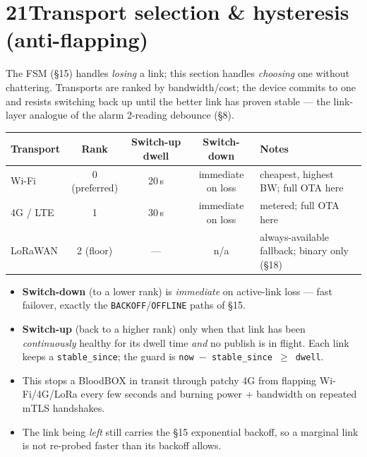 \section*{21\quad Transport selection \& hysteresis (anti-flapping)}
The FSM (\S15) handles \emph{losing} a link; this section handles \emph{choosing} one without
chattering. Transports are ranked by bandwidth/cost; the device commits to one and resists switching
back up until the better link has proven stable — the link-layer analogue of the alarm 2-reading
debounce (\S8).
\begin{center}
\renewcommand{\arraystretch}{1.22}\small
\begin{tabularx}{\textwidth}{@{}l c c c X@{}}
\toprule
\textbf{Transport} & \textbf{Rank} & \textbf{Switch-up dwell} & \textbf{Switch-down} & \textbf{Notes} \\
\midrule
Wi-Fi      & 0 (preferred) & 20\,s & immediate on loss & cheapest, highest BW; full OTA here \\
4G / LTE   & 1             & 30\,s & immediate on loss & metered; full OTA here \\
LoRaWAN    & 2 (floor)     & ---   & n/a               & always-available fallback; binary only (\S18) \\
\bottomrule
\end{tabularx}
\end{center}
\begin{itemize}[leftmargin=1.4em,itemsep=1pt]
  \item \textbf{Switch-down} (to a lower rank) is \emph{immediate} on active-link loss — fast
        failover, exactly the \texttt{BACKOFF}/\texttt{OFFLINE} paths of \S15.
  \item \textbf{Switch-up} (back to a higher rank) only when that link has been \emph{continuously}
        healthy for its dwell time \emph{and} no publish is in flight. Each link keeps a
        \texttt{stable\_since}; the guard is \texttt{now $-$ stable\_since $\geq$ dwell}.
  \item This stops a BloodBOX in transit through patchy 4G from flapping Wi-Fi/4G/LoRa every few
        seconds and burning power + bandwidth on repeated mTLS handshakes.
  \item The link being \emph{left} still carries the \S15 exponential backoff, so a marginal link is
        not re-probed faster than its backoff allows.
\end{itemize}

